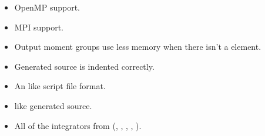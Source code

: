\documentclass[letterpaper,10pt,english]{sphinxmanual}
\begin{document}
\begin{itemize}
\item {} 
\sphinxAtStartPar
OpenMP support.

\item {} 
\sphinxAtStartPar
MPI support.

\item {} 
\sphinxAtStartPar
Output moment groups use less memory when there isn’t a  element.

\item {} 
\sphinxAtStartPar
Generated source is indented correctly.

\item {} 
\sphinxAtStartPar
An \sphinxhyphen{}like script file format.

\item {} 
\sphinxAtStartPar
{}\sphinxhyphen{}like generated source.

\item {} 
\sphinxAtStartPar
All of the integrators from  (, , , , ).

\end{itemize}



\renewcommand{\indexname}{Index}
\printindex
\end{document}
